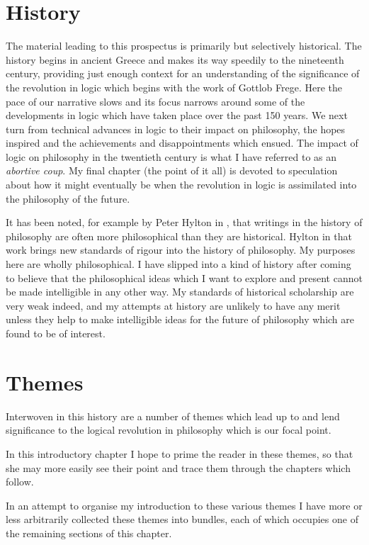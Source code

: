 \section{History}

The material leading to this prospectus is primarily but selectively historical.
The history begins in ancient Greece and makes its way speedily to the nineteenth century, providing just enough context for an understanding of the significance of the revolution in logic which begins with the work of Gottlob Frege.
Here the pace of our narrative slows and its focus narrows around some of the developments in logic which have taken place over the past 150 years.
We next turn from technical advances in logic to their impact on philosophy, the hopes inspired and the achievements and disappointments which ensued.
The impact of logic on philosophy in the twentieth century is what I have referred to as an {\it abortive coup}.
My final chapter (the point of it all) is devoted to speculation about how it might eventually be when the revolution in logic is assimilated into the philosophy of the future.

It has been noted, for example by Peter Hylton in \cite{hyltonREAP}, that writings in the history of philosophy are often more philosophical than they are historical.
Hylton in that work brings new standards of rigour into the history of philosophy.
My purposes here are wholly philosophical.
I have slipped into a kind of history after coming to believe that the philosophical ideas which I want to explore and present cannot be made intelligible in any other way.
My standards of historical scholarship are very weak indeed, and my attempts at history are unlikely to have any merit unless they help to make intelligible ideas for the future of philosophy which are found to be of interest.

\section{Themes}

Interwoven in this history are a number of themes which lead up to and lend significance to the logical revolution in philosophy which is our focal point.

In this introductory chapter I hope to prime the reader in these themes, so that she may more easily see their point and trace them through the chapters which follow.

In an attempt to organise my introduction to these various themes I have more or less arbitrarily collected these themes into bundles, each of which occupies one of the remaining sections of this chapter.

